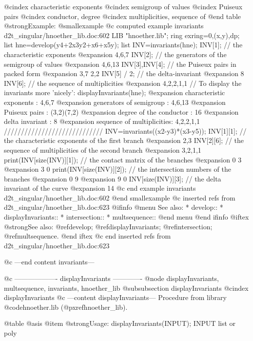 @cindex characteristic exponents
@cindex semigroup of values
@cindex Puiseux pairs
@cindex conductor, degree
@cindex multiplicities, sequence of
@end table
@strong{Example:}
@smallexample
@c computed example invariants d2t_singular/hnoether_lib.doc:602 
LIB "hnoether.lib";
ring exring=0,(x,y),dp;
list hne=develop(y4+2x3y2+x6+x5y);
list INV=invariants(hne);
INV[1];                   // the characteristic exponents
@expansion{} 4,6,7
INV[2];                   // the generators of the semigroup of values
@expansion{} 4,6,13
INV[3],INV[4];            // the Puiseux pairs in packed form
@expansion{} 3,7 2,2
INV[5] / 2;               // the delta-invariant
@expansion{} 8
INV[6];                   // the sequence of multiplicities
@expansion{} 4,2,2,1,1
// To display the invariants more 'nicely':
displayInvariants(hne);
@expansion{}  characteristic exponents  : 4,6,7
@expansion{}  generators of semigroup   : 4,6,13
@expansion{}  Puiseux pairs             : (3,2)(7,2)
@expansion{}  degree of the conductor   : 16
@expansion{}  delta invariant           : 8
@expansion{}  sequence of multiplicities: 4,2,2,1,1
/////////////////////////////
INV=invariants((x2-y3)*(x3-y5));
INV[1][1];                // the characteristic exponents of the first branch
@expansion{} 2,3
INV[2][6];                // the sequence of multiplicities of the second branch
@expansion{} 3,2,1,1
print(INV[size(INV)][1]);         // the contact matrix of the branches
@expansion{}      0     3
@expansion{}      3     0
print(INV[size(INV)][2]);         // the intersection numbers of the branches
@expansion{}      0     9
@expansion{}      9     0
INV[size(INV)][3];                // the delta invariant of the curve
@expansion{} 14
@c end example invariants d2t_singular/hnoether_lib.doc:602
@end smallexample
@c inserted refs from d2t_singular/hnoether_lib.doc:623
@ifinfo
@menu
See also:
* develop::
* displayInvariants::
* intersection::
* multsequence::
@end menu
@end ifinfo
@iftex
@strong{See also:}
@ref{develop};
@ref{displayInvariants};
@ref{intersection};
@ref{multsequence}.
@end iftex
@c end inserted refs from d2t_singular/hnoether_lib.doc:623

@c ---end content invariants---

@c ------------------- displayInvariants -------------
@node displayInvariants, multsequence, invariants, hnoether_lib
@subsubsection displayInvariants
@cindex displayInvariants
@c ---content displayInvariants---
Procedure from library @code{hnoether.lib} (@pxref{hnoether_lib}).

@table @asis
@item @strong{Usage:}
displayInvariants(INPUT); INPUT list or poly

